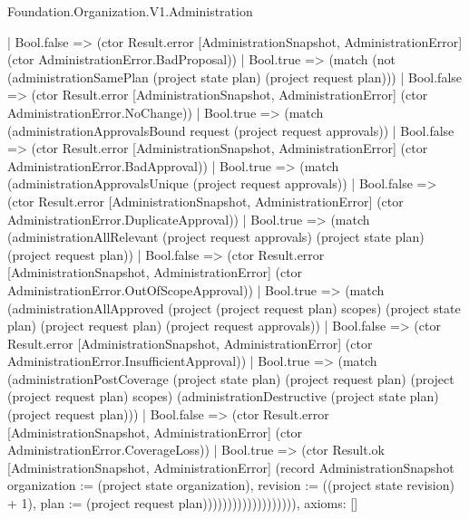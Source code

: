 \begin{lexlean}{Foundation.Organization.V1.Administration}
\begin{semanticmodule}
{                      | Bool.false => (ctor Result.error [AdministrationSnapshot, AdministrationError] (ctor AdministrationError.BadProposal))
                      | Bool.true => (match (not (administrationSamePlan (project state plan) (project request plan)))
                        | Bool.false => (ctor Result.error [AdministrationSnapshot, AdministrationError] (ctor AdministrationError.NoChange))
                        | Bool.true => (match (administrationApprovalsBound request (project request approvals))
                          | Bool.false => (ctor Result.error [AdministrationSnapshot, AdministrationError] (ctor AdministrationError.BadApproval))
                          | Bool.true => (match (administrationApprovalsUnique (project request approvals))
                            | Bool.false => (ctor Result.error [AdministrationSnapshot, AdministrationError] (ctor AdministrationError.DuplicateApproval))
                            | Bool.true => (match (administrationAllRelevant (project request approvals) (project state plan) (project request plan))
                              | Bool.false => (ctor Result.error [AdministrationSnapshot, AdministrationError] (ctor AdministrationError.OutOfScopeApproval))
                              | Bool.true => (match (administrationAllApproved (project (project request plan) scopes) (project state plan) (project request plan) (project request approvals))
                                | Bool.false => (ctor Result.error [AdministrationSnapshot, AdministrationError] (ctor AdministrationError.InsufficientApproval))
                                | Bool.true => (match (administrationPostCoverage (project state plan) (project request plan) (project (project request plan) scopes) (administrationDestructive (project state plan) (project request plan)))
                                  | Bool.false => (ctor Result.error [AdministrationSnapshot, AdministrationError] (ctor AdministrationError.CoverageLoss))
                                  | Bool.true => (ctor Result.ok [AdministrationSnapshot, AdministrationError] (record AdministrationSnapshot {organization := (project state organization), revision := ((project state revision) + 1), plan := (project request plan)})))))))))))))))))),
  axioms: []
}


\end{semanticmodule}
\end{lexlean}

